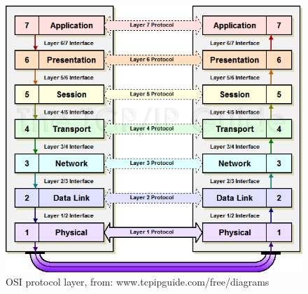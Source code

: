 \documentclass[a4paper,12pt]{article}
\begin{document}
 \begin{figure}[h!] 
 	\begin{center}
 		\includegraphics[width=0.8\linewidth]{OSIprotocols.png} 
 		\caption{OSI protocol layer, from: www.tcpipguide.com/free/diagrams}
 	\end{center}	
 \end{figure}
 
\end{document}

